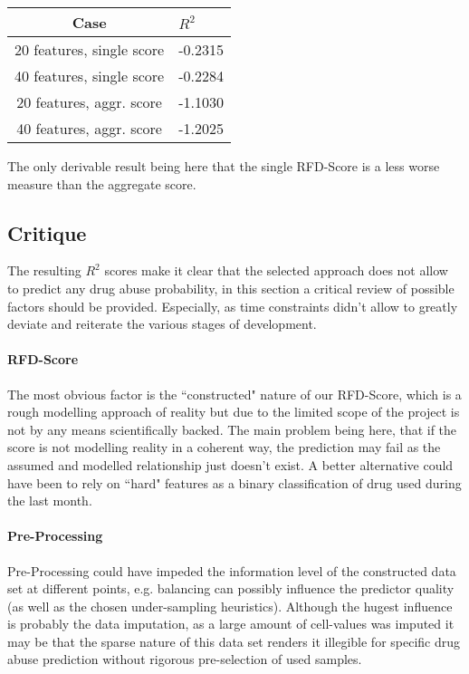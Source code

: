 \documentclass[12pt]{article}
\begin{document}
\begin{table}[H]
	\centering
	\begin{tabular}{c|l}
		Case& $R^2$ \\ 
		\hline
		20 features, single score&	-0.2315	\\
		40 features, single score&	-0.2284	\\	
		20 features, aggr. score&	-1.1030	\\
		40 features, aggr. score&	-1.2025	\\
		
		
	\end{tabular}
\end{table}

The only derivable result being here that the single RFD-Score is a less worse measure than the aggregate score.


\subsection{Critique}

The resulting $R^2$ scores make it clear that the selected approach does not allow to predict any drug abuse probability, in this section a critical review of possible factors should be provided. Especially, as time constraints didn't allow to greatly deviate and reiterate the various stages of development.

\paragraph{RFD-Score} 
The most obvious factor is the ``constructed" nature of our RFD-Score, which is a rough modelling approach of reality but due to the limited scope of the project is not by any means scientifically backed. The main problem being here, that if the score is not modelling reality in a coherent way, the prediction may fail as the assumed and modelled relationship just doesn't exist. A better alternative could have been to rely on ``hard" features as a binary classification of drug used during the last month.

\paragraph{Pre-Processing}
Pre-Processing could have impeded the information level of the constructed data set at different points, e.g. balancing can possibly influence the predictor quality (as well as the chosen under-sampling heuristics). Although the hugest influence is probably the data imputation, as a large amount of cell-values was imputed it may be that the sparse nature of this data set renders it illegible for specific drug abuse prediction without rigorous pre-selection of used samples.
\end{document}
